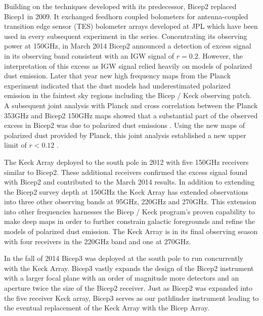 \documentclass[12pt]{article}
\begin{document}
Building on the techniques developed with its predecessor, Bicep2 replaced
Bicep1 in 2009. It exchanged feedhorn coupled bolometers for antenna-coupled
transition edge sensor (TES) bolometer arrays developed at JPL which have been
used in every subsequent experiment in the series. Concentrating its observing
power at 150GHz, in March 2014 Bicep2 announced a detection of excess signal
in its observing band consistent with an IGW signal of $r=0.2$\cite{cite:BK1}.
However, the interpretation of this excess as IGW signal relied heavily on
models of polarized dust emission. Later that year new high frequency maps from the Planck experiment
indicated that the dust models had underestimated polarized emission in the
faintest sky regions \cite{cite:PlanckXIX} including the Bicep / Keck
observing patch. A subsequent joint analysis with Planck and cross correlation
between the Planck 353GHz and Bicep2 150GHz maps showed that a substantial
part of the observed excess in Bicep2 was due to polarized dust emissions
\cite{cite:BKP}. Using the new maps of polarized dust provided by Planck, this
joint analysis established a new upper limit of $r<0.12$ \cite{cite:BKP}.

The Keck Array deployed to the south pole in 2012 with five 150GHz receivers
similar to Bicep2. These additional receivers confirmed the excess signal
found with Bicep2 and contributed to the March 2014 results. In addition to
extending the Bicep2 survey depth at 150GHz the Keck Array has extended
observations into three other observing bands at 95GHz, 220GHz and 270GHz.
This extension into other frequencies harnesses the Bicep / Keck program's
proven capability to make deep maps in order to further constrain galactic foregrounds
and refine the models of polarized dust emission. The Keck Array is in its
final observing season with four receivers in the 220GHz band and one at
270GHz.

In the fall of 2014 Bicep3 was deployed at the south pole to run concurrently
with the Keck Array. Bicep3 vastly expands the design of the Bicep2 instrument
with a larger focal plane with an order of magnitude more detectors and an aperture
twice the size of the Bicep2 receiver. Just as Bicep2 was expanded into the
five receiver Keck array, Bicep3 serves as our pathfinder instrument leading
to the eventual replacement of the Keck Array with the Bicep Array.
\end{document}
